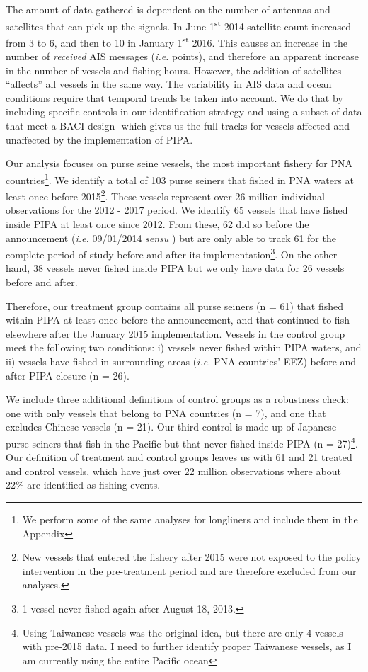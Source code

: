 \documentclass[11pt,]{article}
\let\rmarkdownfootnote\footnote%
\def\footnote{\protect\rmarkdownfootnote}
\begin{document}
The amount of data gathered is dependent on the number of antennas and
satellites that can pick up the signals. In June 1\textsuperscript{st}
2014 satellite count increased from 3 to 6, and then to 10 in January
1\textsuperscript{st} 2016. This causes an increase in the number of
\emph{received} AIS messages (\emph{i.e.} points), and therefore an
apparent increase in the number of vessels and fishing hours. However,
the addition of satellites ``affects'' all vessels in the same way. The
variability in AIS data and ocean conditions require that temporal
trends be taken into account. We do that by including specific controls
in our identification strategy and using a subset of data that meet a
BACI design -which gives us the full tracks for vessels affected and
unaffected by the implementation of PIPA.

Our analysis focuses on purse seine vessels, the most important fishery
for PNA
countries\footnote{We perform some of the same analyses for longliners and include them in the Appendix}.
We identify a total of 103 purse seiners that fished in PNA waters at
least once before
2015\footnote{New vessels that entered the fishery after 2015 were not exposed to the policy intervention in the pre-treatment period and are therefore excluded from our analyses.}.
These vessels represent over 26 million individual observations for the
2012 - 2017 period. We identify 65 vessels that have fished inside PIPA
at least once since 2012. From these, 62 did so before the announcement
(\emph{i.e.} 09/01/2014 \emph{sensu} \citep{mcdermott_2018}) but are
only able to track 61 for the complete period of study before and after
its
implementation\footnote{1 vessel never fished again after August 18, 2013.}.
On the other hand, 38 vessels never fished inside PIPA but we only have
data for 26 vessels before and after.

Therefore, our treatment group contains all purse seiners (n = 61) that
fished within PIPA at least once before the announcement, and that
continued to fish elsewhere after the January 2015 implementation.
Vessels in the control group meet the following two conditions: i)
vessels never fished within PIPA waters, and ii) vessels have fished in
surrounding areas (\emph{i.e.} PNA-countries' EEZ) before and after PIPA
closure (n = 26).

We include three additional definitions of control groups as a
robustness check: one with only vessels that belong to PNA countries (n
= 7), and one that excludes Chinese vessels (n = 21). Our third control
is made up of Japanese purse seiners that fish in the Pacific but that
never fished inside PIPA (n =
27)\footnote{Using Taiwanese vessels was the original idea, but there are only 4 vessels with pre-2015 data. I need to further identify proper Taiwanese vessels, as I am currently using the entire Pacific ocean}.
Our definition of treatment and control groups leaves us with 61 and 21
treated and control vessels, which have just over 22 million
observations where about 22\% are identified as fishing events.
\end{document}
